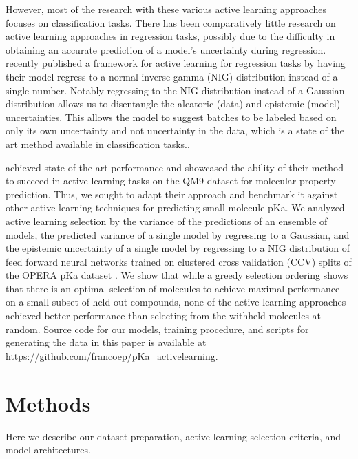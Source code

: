\documentclass[journal=jmcmar,manuscript=article]{achemso}
\begin{document}
However, most of the research with these various active learning approaches focuses on classification tasks. There has been comparatively little research on active learning approaches in regression tasks\cite{alreggreedysample,alnigregress}, possibly due to the difficulty in obtaining an accurate prediction of a model's uncertainty during regression. \citet{alnigregress} recently published a framework for active learning for regression tasks by having their model regress to a normal inverse gamma (NIG) distribution instead of a single number. Notably regressing to  the NIG distribution instead of a Gaussian distribution allows us to disentangle the aleatoric (data) and epistemic (model) uncertainties. \cite{alnigregress} This allows the model to suggest batches to be labeled based on only its own uncertainty and not uncertainty in the data, which is a state of the art method available in classification tasks.\cite{directepistemicunc}. 

\citet{alnigregress} achieved state of the art performance and showcased the ability of their method to succeed in active learning tasks on the QM9 dataset for molecular property prediction. Thus, we sought to adapt their approach and benchmark it against other active learning techniques for predicting small molecule pKa. We analyzed active learning selection by the variance of the predictions of an ensemble of models, the predicted variance of a single model by regressing to a Gaussian, and the epistemic uncertainty of a single model by regressing to a NIG distribution of feed forward neural networks trained on clustered cross validation (CCV) splits of the OPERA pKa dataset \cite{operapKa}. We show that while a greedy selection ordering shows that there is an optimal selection of molecules to achieve maximal performance on a small subset of held out compounds, none of the active learning approaches achieved better performance than selecting from the withheld molecules at random. Source code for our models, training procedure, and scripts for generating the data in this paper is available at \url{https://github.com/francoep/pKa_activelearning}.

\section{Methods}
Here we describe our dataset preparation, active learning selection criteria, and model architectures.
\end{document}
